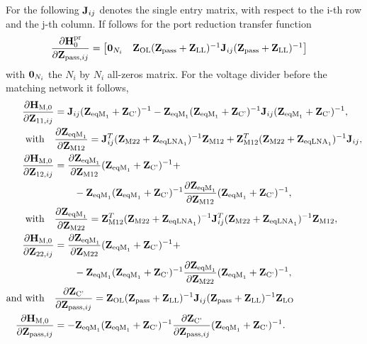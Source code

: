 For the following $\mathbf{J}_{ij}$ denotes the single entry matrix, with respect to the i-th row and the j-th column.
If follows for the port reduction transfer function
\begin{align}
\label{eq:H0_sig_grad}
\frac{\partial\mathbf{H}_0^{\text{pr}}}{\partial\mathbf{Z}_{\text{pass},ij}}&=
\begin{bmatrix}
\mathbf{0}_{N_i} & \mathbf{Z}_\text{OL}(\mathbf{Z}_\text{pass}+\mathbf{Z}_\text{LL})^{-1}\mathbf{J}_{ij}(\mathbf{Z}_{\text{pass}}+\mathbf{Z}_\text{LL})^{-1}
\end{bmatrix}
\end{align}
with $\mathbf{0}_{N_i}$ the $N_i$ by $N_i$ all-zeros matrix.
For the voltage divider before the matching network it follows,
\begin{align}
\label{eq:HM0_sig_grad}
\frac{\partial\mathbf{H}_\text{M,0}}{\partial\mathbf{Z}_{11,ij}}&=
\mathbf{J}_{ij}(\mathbf{Z}_{\text{eqM}_1} + \mathbf{Z}_\text{C'})^{-1} - \mathbf{Z}_{\text{eqM}_1}(\mathbf{Z}_{\text{eqM}_1} + \mathbf{Z}_\text{C'})^{-1}\mathbf{J}_{ij}(\mathbf{Z}_{\text{eqM}_1} + \mathbf{Z}_\text{C'})^{-1},\\\nonumber
\text{with}\quad&\frac{\partial\mathbf{Z}_{\text{eqM}_1}}{\partial\mathbf{Z}_\text{M12}} = 
	\mathbf{J}_{ij}^T(\mathbf{Z}_\text{M22} + \mathbf{Z}_{\text{eqLNA}_1})^{-1}\mathbf{Z}_\text{M12} + 
	\mathbf{Z}_\text{M12}^T(\mathbf{Z}_\text{M22} + \mathbf{Z}_{\text{eqLNA}_1})^{-1}\mathbf{J}_{ij}, \\\nonumber
\frac{\partial\mathbf{H}_\text{M,0}}{\partial\mathbf{Z}_{12,ij}}&=
\frac{\partial\mathbf{Z}_{\text{eqM}_1}}{\partial\mathbf{Z}_\text{M12}}
	(\mathbf{Z}_{\text{eqM}_1} + \mathbf{Z}_\text{C'})^{-1} +\\
  &\qquad- \mathbf{Z}_{\text{eqM}_1}(\mathbf{Z}_{\text{eqM}_1} + \mathbf{Z}_\text{C'})^{-1}
	\frac{\partial\mathbf{Z}_{\text{eqM}_1}}{\partial\mathbf{Z}_\text{M12}}
	(\mathbf{Z}_{\text{eqM}_1} + \mathbf{Z}_\text{C'})^{-1},\\\nonumber
\text{with}\quad&\frac{\partial\mathbf{Z}_{\text{eqM}_1}}{\partial\mathbf{Z}_\text{M22}} = 
\mathbf{Z}_\text{M12}^T(\mathbf{Z}_\text{M22} + \mathbf{Z}_{\text{eqLNA}_1})^{-1}
	\mathbf{J}_{ij}^T(\mathbf{Z}_\text{M22} + \mathbf{Z}_{\text{eqLNA}_1})^{-1}\mathbf{Z}_\text{M12},\\\nonumber
\frac{\partial\mathbf{H}_\text{M,0}}{\partial\mathbf{Z}_{22,ij}}&=
\frac{\partial\mathbf{Z}_{\text{eqM}_1}}{\partial\mathbf{Z}_\text{M22}}
	(\mathbf{Z}_{\text{eqM}_1} + \mathbf{Z}_\text{C'})^{-1} +\\
  &\qquad -\mathbf{Z}_{\text{eqM}_1}(\mathbf{Z}_{\text{eqM}_1} + \mathbf{Z}_\text{C'})^{-1}
	\frac{\partial\mathbf{Z}_{\text{eqM}_1}}{\partial\mathbf{Z}_\text{M22}}
	(\mathbf{Z}_{\text{eqM}_1} + \mathbf{Z}_\text{C'})^{-1},\\\nonumber
\text{and with}\quad&\frac{\partial\mathbf{Z}_\text{C'}}{\partial\mathbf{Z}_{\text{pass},ij}} = 
\mathbf{Z}_\text{OL}(\mathbf{Z}_{\text{pass}}+\mathbf{Z}_\text{LL})^{-1}\mathbf{J}_{ij}(\mathbf{Z}_{\text{pass}}+\mathbf{Z}_\text{LL})^{-1}\mathbf{Z}_\text{LO}\\
\frac{\partial\mathbf{H}_\text{M,0}}{\partial\mathbf{Z}_{\text{pass},ij}}&=
-\mathbf{Z}_{\text{eqM}_1}(\mathbf{Z}_{\text{eqM}_1} + \mathbf{Z}_\text{C'})^{-1}\frac{\partial\mathbf{Z}_\text{C'}}{\partial\mathbf{Z}_{\text{pass},ij}}(\mathbf{Z}_{\text{eqM}_1} + \mathbf{Z}_\text{C'})^{-1}.
\end{align}
